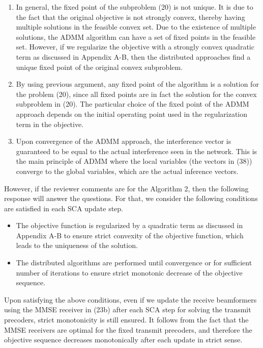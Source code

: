 \begin{enumerate}
\begin{enumerate}
\item In general, the fixed point of the subproblem (20) is not unique. It is due to the fact that the original objective is not strongly convex, thereby having multiple solutions in the feasible convex set. Due to the existence of multiple solutions, the \ac{ADMM} algorithm can have a set of fixed points in the feasible set. However, if we regularize the objective with a strongly convex quadratic term as discussed in Appendix A-B, then the distributed approaches find a unique fixed point of the original convex subproblem.

\item By using previous argument, any fixed point of the algorithm is a solution for the problem (20), since all fixed points are in fact the solution for the convex subproblem in (20). The particular choice of the fixed point of the \ac{ADMM} approach depends on the initial operating point used in the regularization term in the objective.

\item Upon convergence of the \ac{ADMM} approach, the interference vector is guaranteed to be equal to the actual interference seen in the network. This is the main principle of \ac{ADMM} where the local variables (the vectors in (38)) converge to the global variables, which are the actual inference vectors.

\end{enumerate}

However, if the reviewer comments are for the Algorithm 2, then the following response will answer the questions. For that, we consider the following conditions are satisfied in each \ac{SCA} update step.
\begin{itemize}
	\item The objective function is regularized by a quadratic term as discussed in Appendix A-B to ensure strict convexity of the objective function, which leads to the uniqueness of the solution.
	\item The distributed algorithms are performed until convergence or for sufficient number of iterations to ensure strict monotonic decrease of the objective sequence.
\end{itemize}
Upon satisfying the above conditions, even if we update the receive beamformers using the \ac{MMSE} receiver in (23b) after each \ac{SCA} step for solving the transmit precoders, strict monotonicity is still ensured. It follows from the fact that the \ac{MMSE} receivers are optimal for the fixed transmit precoders, and therefore the objective sequence decreases monotonically after each update in strict sense.


\end{enumerate}
